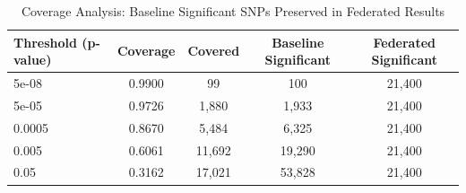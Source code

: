 \begin{table}[htbp]
\centering
\caption{Coverage Analysis: Baseline Significant SNPs Preserved in Federated Results}
\label{tab:coverage}
\begin{tabular}{lcccc}
\toprule
Threshold (p-value) & Coverage & Covered & Baseline Significant & Federated Significant \\
\midrule
5e-08 & 0.9900 & 99 & 100 & 21,400 \\
5e-05 & 0.9726 & 1,880 & 1,933 & 21,400 \\
0.0005 & 0.8670 & 5,484 & 6,325 & 21,400 \\
0.005 & 0.6061 & 11,692 & 19,290 & 21,400 \\
0.05 & 0.3162 & 17,021 & 53,828 & 21,400 \\
\bottomrule
\end{tabular}
\end{table}